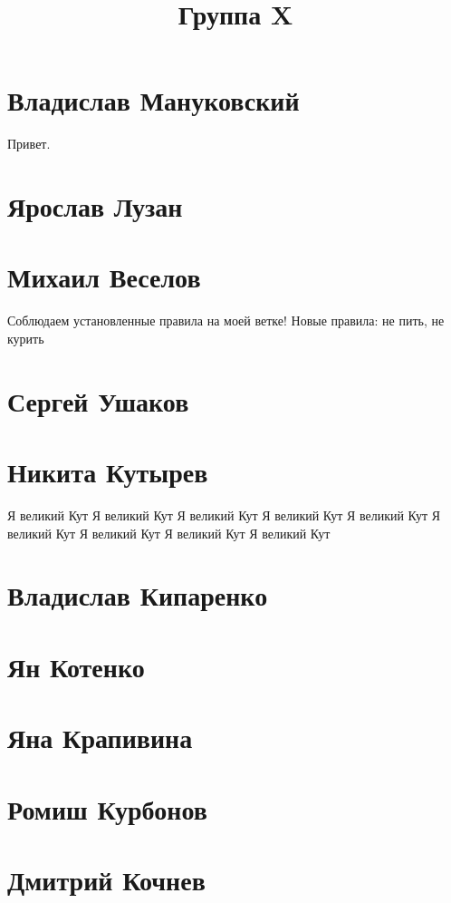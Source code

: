 \documentclass{article}
\title{Группа X}
\begin{document}
\section*{Владислав Мануковский}
Привет.
\section*{Ярослав Лузан}

\section*{Михаил Веселов}

Соблюдаем установленные правила на моей ветке!
Новые правила: не пить, не курить

\section*{Сергей Ушаков}

\section*{Никита Кутырев}
Я великий Кут Я великий Кут Я великий Кут Я великий Кут Я великий Кут Я великий Кут Я великий Кут Я великий Кут Я великий Кут
\section*{Владислав Кипаренко}

\section*{Ян Котенко}

\section*{Яна Крапивина}

\section*{Ромиш Курбонов}

\section*{Дмитрий Кочнев}
\end{document}
